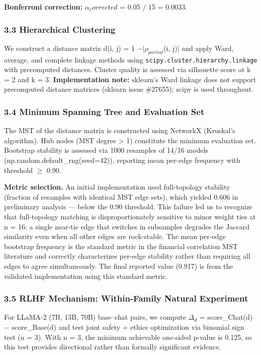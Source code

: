 \textbf{Bonferroni correction:} $\alpha _corrected$ = 0.05 / 15 = 0.0033.

\subsubsection{3.3 Hierarchical Clustering}

We construct a distance matrix d(i, j) = 1 $- |\rho_{partial}$(i, j)| and apply Ward, average, and complete linkage methods using \texttt{scipy.cluster.hierarchy.linkage} with precomputed distances. Cluster quality is assessed via silhouette score at k = 2 and k = 3. \textbf{Implementation note:} sklearn's Ward linkage does not support precomputed distance matrices (sklearn issue \#27655); scipy is used throughout.

\subsubsection{3.4 Minimum Spanning Tree and Evaluation Set}

The MST of the distance matrix is constructed using NetworkX (Kruskal's algorithm). Hub nodes (MST degree > 1) constitute the minimum evaluation set. Bootstrap stability is assessed via 1000 resamples of 14/16 models (np.random.default\_rng(seed=42)), reporting mean per-edge frequency \citep{Tumminello2007MST} with threshold $\geq$ 0.90.

\textbf{Metric selection.} An initial implementation used full-topology stability (fraction of resamples with identical MST edge sets), which yielded 0.606 in preliminary analysis --- below the 0.90 threshold. This failure led us to recognize that full-topology matching is disproportionately sensitive to minor weight ties at n = 16: a single near-tie edge that switches in subsamples degrades the Jaccard similarity even when all other edges are rock-stable. The mean per-edge bootstrap frequency \citep{Tumminello2007MST} is the standard metric in the financial correlation MST literature and correctly characterizes per-edge stability rather than requiring all edges to agree simultaneously. The final reported value (0.917) is from the validated implementation using this standard metric.

\subsubsection{3.5 RLHF Mechanism: Within-Family Natural Experiment}

For LLaMA-2 (7B, 13B, 70B) base--chat pairs, we compute $\Delta _d$ = score\_Chat(d) $-$ score\_Base(d) and test joint safety + ethics optimization via binomial sign test (n = 3). With n = 3, the minimum achievable one-sided p-value is 0.125, so this test provides directional rather than formally significant evidence.

